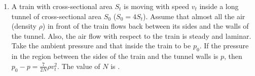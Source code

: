 
\begin{enumerate}
    \item A train with cross-sectional area $S_t$ is moving with speed $v_t$ inside a long tunnel of cross-sectional area $S_0$ ($S_0 = 4S_t$). Assume that almost all the air (density $\rho$) in front of the train flows back between its sides and the walls of the tunnel. Also, the air flow with respect to the train is steady and laminar. Take the ambient pressure and that inside the train to be $p_0$. If the pressure in the region between the sides of the train and the tunnel walls is $p$, then $p_0 - p = \frac{7}{2N}\rho v_t^2$. The value of $N$ is \underline{\hspace{2cm}}.
\end{enumerate}
